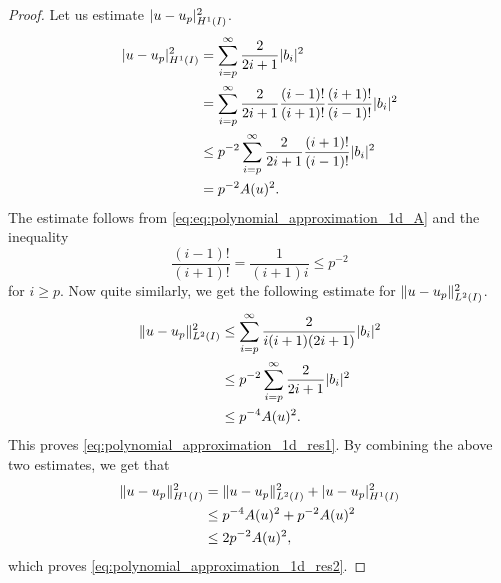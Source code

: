 \documentclass[english, 12pt, a4paper, sci, utf8, a-2b, online]{aaltothesis}
\theoremstyle{definition}
\theoremstyle{plain}
\DeclarePairedDelimiter\abs{\lvert}{\rvert}
\DeclarePairedDelimiter\norm{\lVert}{\rVert}
\numberwithin{equation}{section}
\begin{document}
\begin{proof}
    Let us estimate $\abs{u-u_p}_{H^1(I)}^2$.
    \begin{align*}
        \abs{u-u_p}_{H^1(I)}^2
        &= \sum_{i=p}^{\infty} \frac{2}{2i+1} \abs{b_i}^2 \\
        &= \sum_{i=p}^{\infty} \frac{2}{2i+1}
            \frac{(i-1)!}{(i+1)!} \frac{(i+1)!}{(i-1)!}
            \abs{b_i}^2 \\
        &\leq p^{-2} \sum_{i=p}^{\infty} \frac{2}{2i+1}
            \frac{(i+1)!}{(i-1)!} \abs{b_i}^2 \\
        &= p^{-2} A(u)^2.
    \end{align*}
    The estimate follows from \eqref{eq:eq:polynomial_approximation_1d_A}
    and the inequality
    \begin{equation*}
        \frac{(i-1)!}{(i+1)!}
        = \frac{1}{(i+1)i}
        \leq p^{-2}
    \end{equation*}
    for $i \geq p$. Now quite similarly, we get the following estimate
    for $\norm{u-u_p}_{L^2(I)}^2$.
    \begin{align*}
        \norm{u-u_p}_{L^2(I)}^2
        &\leq \sum_{i=p}^{\infty} \frac{2}{i(i+1)(2i+1)} \abs{b_i}^2 \\
        &\leq p^{-2} \sum_{i=p}^{\infty} \frac{2}{2i+1} \abs{b_i}^2 \\
        &\leq p^{-4} A(u)^2.
    \end{align*}
    This proves \eqref{eq:polynomial_approximation_1d_res1}.
    By combining the above two estimates, we get that
    \begin{align*}
        \norm{u-u_p}_{H^1(I)}^2
        &= \norm{u-u_p}_{L^2(I)}^2 + \abs{u-u_p}_{H^1(I)}^2 \\
        &\leq p^{-4} A(u)^2 + p^{-2} A(u)^2 \\
        &\leq 2 p^{-2} A(u)^2,
    \end{align*}
    which proves \eqref{eq:polynomial_approximation_1d_res2}.


\end{proof}
\end{document}
